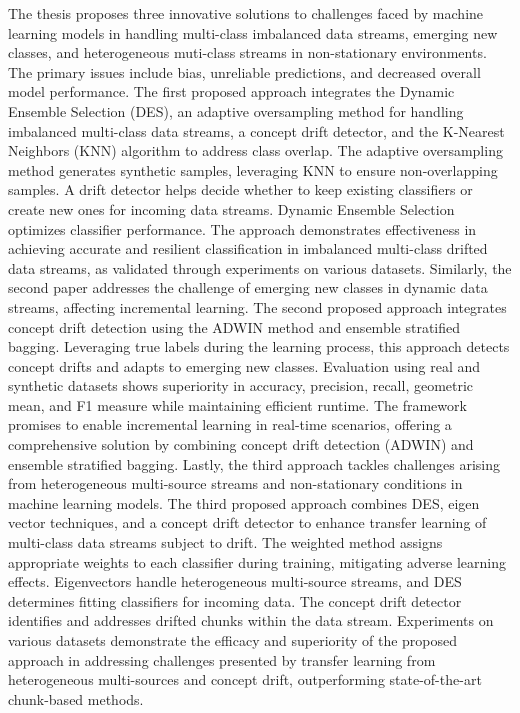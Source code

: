 




\begin{summary}        %
The thesis proposes three innovative solutions to challenges faced by machine learning models in handling multi-class imbalanced data streams, emerging new classes, and heterogeneous muti-class streams in non-stationary environments. The primary issues include bias, unreliable predictions, and decreased overall model performance.
The first proposed approach integrates the Dynamic Ensemble Selection (DES), an adaptive oversampling method for handling imbalanced multi-class data streams, a concept drift detector, and the K-Nearest Neighbors (KNN) algorithm to address class overlap. The adaptive oversampling method generates synthetic samples, leveraging KNN to ensure non-overlapping samples. A drift detector helps decide whether to keep existing classifiers or create new ones for incoming data streams. Dynamic Ensemble Selection optimizes classifier performance. The approach demonstrates effectiveness in achieving accurate and resilient classification in imbalanced multi-class drifted data streams, as validated through experiments on various datasets.
Similarly, the second paper addresses the challenge of emerging new classes in dynamic data streams, affecting incremental learning. The second proposed approach integrates concept drift detection using the ADWIN method and ensemble stratified bagging. Leveraging true labels during the learning process, this approach detects concept drifts and adapts to emerging new classes. Evaluation using real and synthetic datasets shows superiority in accuracy, precision, recall, geometric mean, and F1 measure while maintaining efficient runtime. The framework promises to enable incremental learning in real-time scenarios, offering a comprehensive solution by combining concept drift detection (ADWIN) and ensemble stratified bagging.
Lastly, the third approach tackles challenges arising from heterogeneous multi-source streams and non-stationary conditions in machine learning models. The third proposed approach combines DES, eigen vector techniques, and a concept drift detector to enhance transfer learning of multi-class data streams subject to drift. The weighted method assigns appropriate weights to each classifier during training, mitigating adverse learning effects. Eigenvectors handle heterogeneous multi-source streams, and DES determines fitting classifiers for incoming data. The concept drift detector identifies and addresses drifted chunks within the data stream. Experiments on various datasets demonstrate the efficacy and superiority of the proposed approach in addressing challenges presented by transfer learning from heterogeneous multi-sources and concept drift, outperforming state-of-the-art chunk-based methods.


\end{summary}
